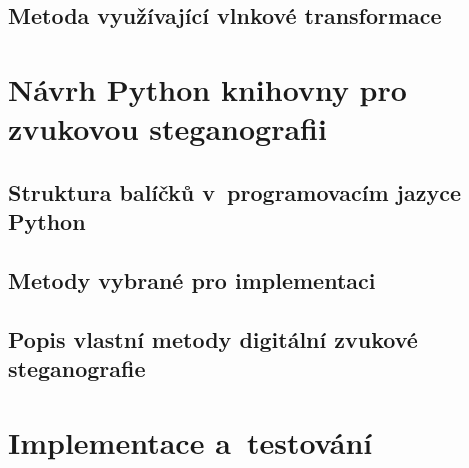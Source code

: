 
\blindtext

\blindtext

\blindtext

\section{Metoda využívající vlnkové transformace}
\label{sec:wavelet-transform}


\blindtext


\chapter{Návrh Python knihovny pro zvukovou steganografii}
\label{cha:library-design}


\blindtext

\section{Struktura balíčků v~programovacím jazyce Python}
\label{sec:python-package-structure}


\blindtext

\blindtext

\section{Metody vybrané pro implementaci}
\label{sec:chosen-methods}


\blindtext

\blindtext

\section{Popis vlastní metody digitální zvukové steganografie}
\label{sec:own-method}


\blindtext

\blindtext


\chapter{Implementace a~testování}
\label{cha:implementation}

